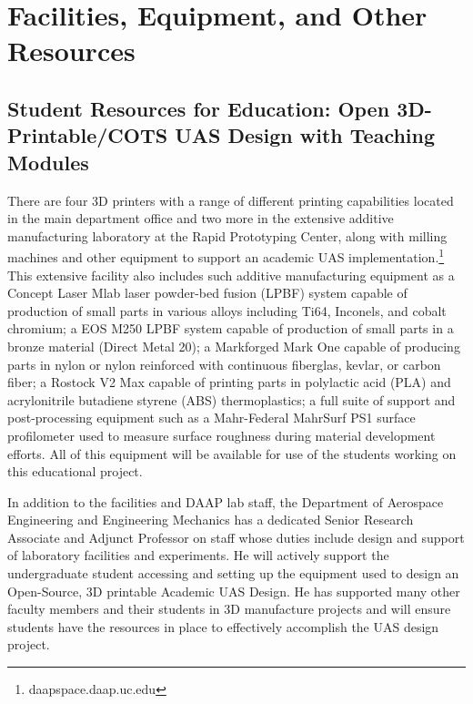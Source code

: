 \documentclass[letterpaper,11pt]{article}
\begin{document}

\section*{Facilities, Equipment, and Other Resources}

\subsection*{Student Resources for Education: Open 3D-Printable/COTS UAS Design with Teaching Modules}

There are four 3D printers with a range of different printing capabilities located in the main department office and two more in the extensive additive manufacturing laboratory at the Rapid Prototyping Center, along with milling machines and other equipment to support an academic UAS implementation.\footnote{daapspace.daap.uc.edu} This extensive facility also includes such additive manufacturing equipment as a Concept Laser Mlab laser powder-bed fusion (LPBF) system capable of production of small parts in various alloys including Ti64, Inconels, and cobalt chromium; a EOS M250 LPBF system capable of production of small parts in a bronze material (Direct Metal 20); a Markforged Mark One capable of producing parts in nylon or nylon reinforced with continuous fiberglas, kevlar, or carbon fiber; a Rostock V2 Max capable of printing parts in polylactic acid (PLA) and acrylonitrile butadiene styrene (ABS) thermoplastics; a full suite of support and post-processing equipment such as a Mahr-Federal MahrSurf PS1 surface profilometer used to measure surface roughness during material development efforts. All of this equipment will be available for use of the students working on this educational project. 

In addition to the facilities and DAAP lab staff, the Department of Aerospace Engineering and Engineering Mechanics has a dedicated Senior Research Associate and Adjunct Professor on staff whose duties include design and support of laboratory facilities and experiments. He will actively support the undergraduate student accessing and setting up the equipment used to design an Open-Source, 3D printable Academic UAS Design. He has supported many other faculty members and their students in 3D manufacture projects and will ensure students have the resources in place to effectively accomplish the UAS design project.
\end{document}
